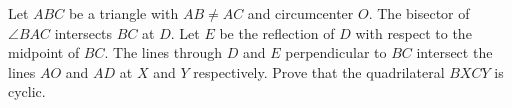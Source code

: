 Let $ABC$ be a triangle with $AB \neq AC$ and circumcenter $O$. The bisector of $\angle BAC$ intersects $BC$ at $D$. Let $E$ be the reflection of $D$ with respect to the midpoint of $BC$. The lines through $D$ and $E$ perpendicular to $BC$ intersect the lines $AO$ and $AD$ at $X$ and $Y$ respectively. Prove that the quadrilateral $BXCY$ is cyclic.
